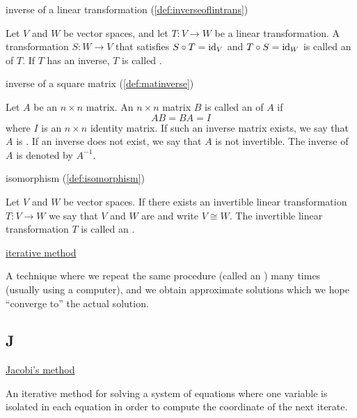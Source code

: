 \documentclass{ximera}
\begin{document}
inverse of a linear transformation (\ref{def:inverseoflintrans})
\begin{expandable}{}{}
    Let $V$ and $W$ be vector spaces, and let $T:V\rightarrow W$ be a linear transformation.  A transformation $S:W\rightarrow V$ that satisfies $S\circ T=\text{id}_V$ and $T\circ S=\text{id}_W$ is called an  of $T$. If $T$ has an inverse, $T$ is called .
\end{expandable}

inverse of a square matrix (\ref{def:matinverse})
\begin{expandable}{}{}
    Let $A$ be an $n\times n$ matrix.  An $n\times n$ matrix $B$ is called an  of $A$ if 
$$AB=BA=I$$
where $I$ is an $n\times n$ identity matrix.  If such an inverse matrix exists, we say that $A$ is .  If an inverse does not exist, we say that $A$ is not invertible.  The inverse of $A$ is denoted by $A^{-1}$.
\end{expandable}

isomorphism (\ref{def:isomorphism})
\begin{expandable}{}{}
    Let $V$ and $W$ be vector spaces.  If there exists an invertible linear transformation $T:V\rightarrow W$ we say that $V$ and $W$ are  and write $V\cong W$.  The invertible linear transformation $T$ is called an .
\end{expandable}


\href{https://ximera.osu.edu/linearalgebradzv3/LinearAlgebraInteractiveIntro/SYS-0040/main}{iterative method}
\begin{expandable}{}{}
    A technique where we repeat the same procedure (called an ) many times (usually using a computer), and we obtain approximate solutions which we hope ``converge to'' the actual solution.
\end{expandable}

\subsection*{J}

\href{https://ximera.osu.edu/linearalgebradzv3/LinearAlgebraInteractiveIntro/SYS-0040/main}{Jacobi's method}
\begin{expandable}{}{}
    An iterative method for solving a system of equations where one variable is isolated in each equation in order to compute the coordinate of the next iterate.
\end{expandable}
\end{document}
